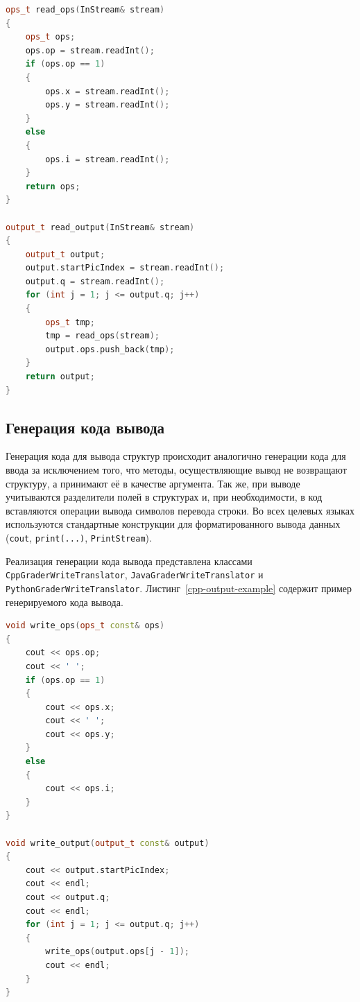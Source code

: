 \documentclass[times,specification,annotation]{style/itmo-student-thesis/itmo-student-thesis}
\begin{document}
\begin{lstlisting}[float=!h,caption={Пример сгенерированного кода ввода в чекере},label={cpp-input-checker-example},language=c++]
ops_t read_ops(InStream& stream)
{
    ops_t ops;
    ops.op = stream.readInt();
    if (ops.op == 1)
    {
        ops.x = stream.readInt();
        ops.y = stream.readInt();
    }
    else
    {
        ops.i = stream.readInt();
    }
    return ops;
}

output_t read_output(InStream& stream)
{
    output_t output;
    output.startPicIndex = stream.readInt();
    output.q = stream.readInt();
    for (int j = 1; j <= output.q; j++)
    {
        ops_t tmp;
        tmp = read_ops(stream);
        output.ops.push_back(tmp);
    }
    return output;
}
\end{lstlisting}

\subsection{Генерация кода вывода}

Генерация кода для вывода структур происходит аналогично генерации кода для ввода за исключением того, что методы, осуществляющие вывод не возвращают структуру, а принимают её в качестве аргумента. Так же, при выводе учитываются разделители полей в структурах и, при необходимости, в код вставляются операции вывода символов перевода строки. Во всех целевых языках используются стандартные конструкции для форматированного вывода данных (\texttt{cout}, \texttt{print(...)}, \texttt{PrintStream}).

Реализация генерации кода вывода представлена классами \texttt{CppGraderWriteTranslator}, \texttt{JavaGraderWriteTranslator} и \texttt{PythonGraderWriteTranslator}. Листинг~\ref{cpp-output-example} содержит пример генерируемого кода вывода.

\begin{lstlisting}[float=!h,caption={Пример сгенерированного кода вывода},label={cpp-output-example},language=c++]
void write_ops(ops_t const& ops)
{
    cout << ops.op;
    cout << ' ';
    if (ops.op == 1)
    {
        cout << ops.x;
        cout << ' ';
        cout << ops.y;
    }
    else
    {
        cout << ops.i;
    }
}

void write_output(output_t const& output)
{
    cout << output.startPicIndex;
    cout << endl;
    cout << output.q;
    cout << endl;
    for (int j = 1; j <= output.q; j++)
    {
        write_ops(output.ops[j - 1]);
        cout << endl;
    }
}
\end{lstlisting}
\end{document}
